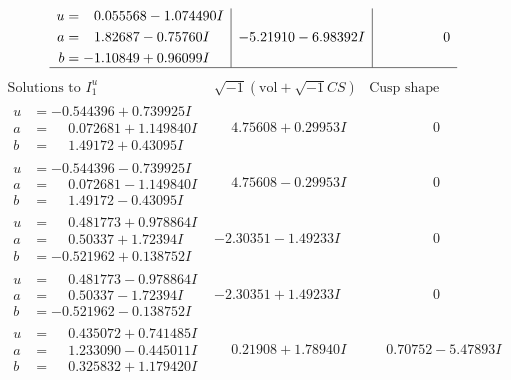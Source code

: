 \documentclass[1p]{elsarticle_modified}
\theoremstyle{definition}
\newcommand{\I}{\sqrt{-1}}
\begin{document}
$$\begin{array}{c|c|c}
\begin{aligned}
u &= \phantom{-}0.055568 - 1.074490 I \\
a &= \phantom{-}1.82687 - 0.75760 I \\
b &= -1.10849 + 0.96099 I\end{aligned}
 & -5.21910 - 6.98392 I & \phantom{-0.000000 } 0\\
 \hline 
 \end{array}$$\newpage$$\begin{array}{c|c|c}  
\text{Solutions to }I^u_{1}& \I (\text{vol} + \sqrt{-1}CS) & \text{Cusp shape}\\
 \hline 
\begin{aligned}
u &= -0.544396 + 0.739925 I \\
a &= \phantom{-}0.072681 + 1.149840 I \\
b &= \phantom{-}1.49172 + 0.43095 I\end{aligned}
 & \phantom{-}4.75608 + 0.29953 I & \phantom{-0.000000 } 0 \\ \hline\begin{aligned}
u &= -0.544396 - 0.739925 I \\
a &= \phantom{-}0.072681 - 1.149840 I \\
b &= \phantom{-}1.49172 - 0.43095 I\end{aligned}
 & \phantom{-}4.75608 - 0.29953 I & \phantom{-0.000000 } 0 \\ \hline\begin{aligned}
u &= \phantom{-}0.481773 + 0.978864 I \\
a &= \phantom{-}0.50337 + 1.72394 I \\
b &= -0.521962 + 0.138752 I\end{aligned}
 & -2.30351 - 1.49233 I & \phantom{-0.000000 } 0 \\ \hline\begin{aligned}
u &= \phantom{-}0.481773 - 0.978864 I \\
a &= \phantom{-}0.50337 - 1.72394 I \\
b &= -0.521962 - 0.138752 I\end{aligned}
 & -2.30351 + 1.49233 I & \phantom{-0.000000 } 0 \\ \hline\begin{aligned}
u &= \phantom{-}0.435072 + 0.741485 I \\
a &= \phantom{-}1.233090 - 0.445011 I \\
b &= \phantom{-}0.325832 + 1.179420 I\end{aligned}
 & \phantom{-}0.21908 + 1.78940 I & \phantom{-}0.70752 - 5.47893 I \\ \hline\begin{aligned}

\end{aligned}
\end{array}$$
\end{document}
